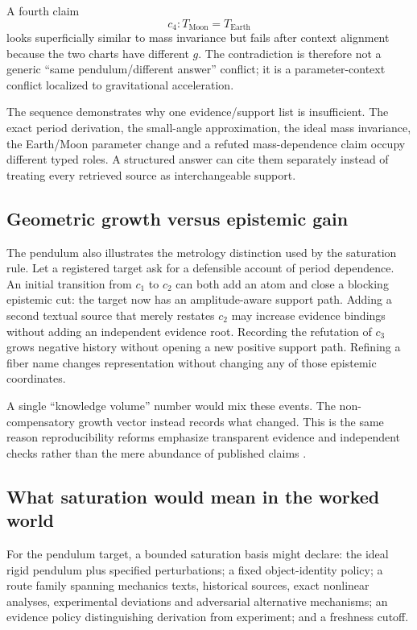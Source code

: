 \documentclass[11pt]{article}
\begin{document}
A fourth claim
\[
c_4:T_{\mathrm{Moon}}=T_{\mathrm{Earth}}
\]
looks superficially similar to mass invariance but fails after context alignment because the two charts have different \(g\). The contradiction is therefore not a generic ``same pendulum/different answer'' conflict; it is a parameter-context conflict localized to gravitational acceleration.

The sequence demonstrates why one evidence/support list is insufficient. The exact period derivation, the small-angle approximation, the ideal mass invariance, the Earth/Moon parameter change and a refuted mass-dependence claim occupy different typed roles. A structured answer can cite them separately instead of treating every retrieved source as interchangeable support.

\subsection{Geometric growth versus epistemic gain}

The pendulum also illustrates the metrology distinction used by the saturation rule. Let a registered target ask for a defensible account of period dependence. An initial transition from \(c_1\) to \(c_2\) can both add an atom and close a blocking epistemic cut: the target now has an amplitude-aware support path. Adding a second textual source that merely restates \(c_2\) may increase evidence bindings without adding an independent evidence root. Recording the refutation of \(c_3\) grows negative history without opening a new positive support path. Refining a fiber name changes representation without changing any of those epistemic coordinates.

A single ``knowledge volume'' number would mix these events. The non-compensatory growth vector instead records what changed. This is the same reason reproducibility reforms emphasize transparent evidence and independent checks rather than the mere abundance of published claims \cite{nosek2015,munafo2017}.

\subsection{What saturation would mean in the worked world}

For the pendulum target, a bounded saturation basis might declare: the ideal rigid pendulum plus specified perturbations; a fixed object-identity policy; a route family spanning mechanics texts, historical sources, exact nonlinear analyses, experimental deviations and adversarial alternative mechanisms; an evidence policy distinguishing derivation from experiment; and a freshness cutoff.
\end{document}
